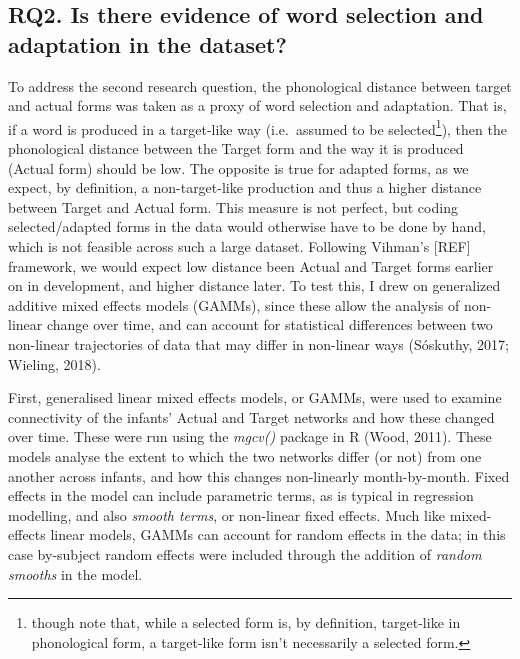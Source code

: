 \documentclass[
  man]{apa6}
\begin{document}
\hypertarget{rq2.-is-there-evidence-of-word-selection-and-adaptation-in-the-dataset}{%
\subsection{RQ2. Is there evidence of word selection and adaptation in the dataset?}\label{rq2.-is-there-evidence-of-word-selection-and-adaptation-in-the-dataset}}

To address the second research question, the phonological distance between target and actual forms was taken as a proxy of word selection and adaptation. That is, if a word is produced in a target-like way (i.e.~assumed to be selected\footnote{though note that, while a selected form is, by definition, target-like in phonological form, a target-like form isn't necessarily a selected form.}), then the phonological distance between the Target form and the way it is produced (Actual form) should be low. The opposite is true for adapted forms, as we expect, by definition, a non-target-like production and thus a higher distance between Target and Actual form. This measure is not perfect, but coding selected/adapted forms in the data would otherwise have to be done by hand, which is not feasible across such a large dataset. Following Vihman's {[}REF{]} framework, we would expect low distance been Actual and Target forms earlier on in development, and higher distance later. To test this, I drew on generalized additive mixed effects models (GAMMs), since these allow the analysis of non-linear change over time, and can account for statistical differences between two non-linear trajectories of data that may differ in non-linear ways (Sóskuthy, 2017; Wieling, 2018).

First, generalised linear mixed effects models, or GAMMs, were used to examine connectivity of the infants' Actual and Target networks and how these changed over time. These were run using the \emph{mgcv()} package in R (Wood, 2011). These models analyse the extent to which the two networks differ (or not) from one another across infants, and how this changes non-linearly month-by-month. Fixed effects in the model can include parametric terms, as is typical in regression modelling, and also \emph{smooth terms}, or non-linear fixed effects. Much like mixed-effects linear models, GAMMs can account for random effects in the data; in this case by-subject random effects were included through the addition of \emph{random smooths} in the model.
\end{document}
